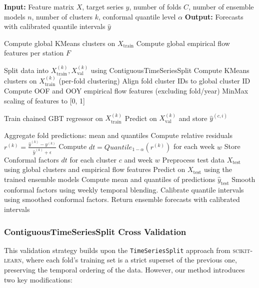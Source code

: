 \documentclass[a4paper,12pt]{article}
\begin{document}
\begin{algorithm}[H]
\caption{Chained Ensemble Forecasting}
\begin{algorithmic}[1]
\State \textbf{Input:} Feature matrix $X$, target series $y$, number of folds $C$, number of ensemble models $n$, number of clusters $k$, conformal quantile level $\alpha$
\State \textbf{Output:} Forecasts with calibrated quantile intervals $\hat{y}$

\State Compute global KMeans clusters on $X_{\text{train}}$
\State Compute global empirical flow features per station $F$

    \State Split data into $X^{(k)}_{\text{train}}, X^{(k)}_{\text{val}}$ using ContiguousTimeSeriesSplit
    \State Compute KMeans clusters on $X^{(k)}_{\text{train}}$ (per-fold clustering)
    \State Align fold cluster IDs to global cluster ID
    \State Compute OOF and OOY empirical flow features (excluding fold/year)
    \State MinMax scaling of features to [0, 1]
    
        \State Train chained GBT regressor on $X^{(k)}_{\text{train}}$
        \State Predict on $X^{(k)}_{\text{val}}$ and store $\hat{y}^{(c,i)}$
    \EndFor
    
    \State Aggregate fold predictions: mean and quantiles
    \State Compute relative residuals $r^{(k)} = \frac{\hat{y}^{(k)} - y^{(k)}}{\hat{y}^{(k)} + \epsilon}$
    \State Compute $d{t} = Quantile_{1-\alpha}(r^{(k)})$ for each week $w$
    \State Store Conformal factors $d{t}$ for each cluster $c$ and week $w$
\EndFor
\State Preprocess test data $X_{\text{test}}$ using global clusters and empirical flow features
\State Predict on $X_{\text{test}}$ using the trained ensemble models
\State Compute mean and quantiles of predictions $\hat{y}_{\text{test}}$
\State Smooth conformal factors using weekly temporal blending.
\State Calibrate quantile intervals using smoothed conformal factors.
\State Return ensemble forecasts with calibrated intervals
\end{algorithmic}
\end{algorithm}


\subsubsection{ContiguousTimeSeriesSplit Cross Validation}
This validation strategy builds upon the \texttt{TimeSeriesSplit} approach from \textsc{scikit-learn}, where each fold's training set is a strict superset of the previous one, preserving the temporal ordering of the data. However, our method introduces two key modifications:
\end{document}
